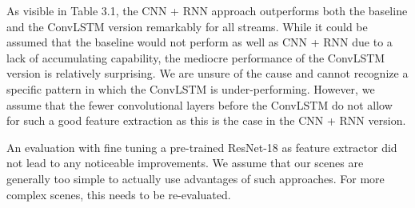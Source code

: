 As visible in Table 3.1, the CNN + RNN approach outperforms both the baseline and the ConvLSTM
version remarkably for all streams. While it could be assumed that the baseline would not perform
as well as CNN + RNN due to a lack of accumulating capability, the mediocre performance of the
ConvLSTM version is relatively surprising. We are unsure of the cause and cannot recognize a speciﬁc
pattern in which the ConvLSTM is under-performing. However, we assume that the fewer convolutional
layers before the ConvLSTM do not allow for such a good feature extraction as this is the case in the
CNN + RNN version. 

An evaluation with ﬁne tuning a pre-trained ResNet-18 as feature extractor did not lead to any
noticeable improvements. We assume that our scenes are generally too simple to actually use advantages
of such approaches. For more complex scenes, this needs to be re-evaluated.
